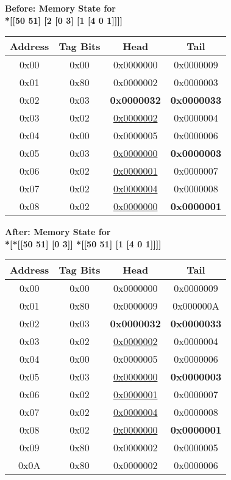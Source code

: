 \begin{figure}[htbp]
\centering

\textbf{Before: Memory State for \\ *[[50 51] [2 [0 3] [1 [4 0 1]]]]}

\vspace{0.3cm}

\begin{tabular}{|c|c|c|c|}
\hline
\textbf{Address} & \textbf{Tag Bits} & \textbf{Head} & \textbf{Tail} \\
\hline\hline
0x00 & 0x00 & 0x0000000 & 0x0000009 \\
0x01 & 0x80 & 0x0000002 & 0x0000003 \\
0x02 & 0x03 & \textbf{0x0000032} & \textbf{0x0000033} \\
0x03 & 0x02 & \underline{0x0000002} & 0x0000004 \\
0x04 & 0x00 & 0x0000005 & 0x0000006 \\
0x05 & 0x03 & \underline{0x0000000} & \textbf{0x0000003} \\
0x06 & 0x02 & \underline{0x0000001} & 0x0000007 \\
0x07 & 0x02 & \underline{0x0000004} & 0x0000008 \\
0x08 & 0x02 & \underline{0x0000000} & \textbf{0x0000001} \\
\hline
\end{tabular}

\vspace{0.5cm}

\textbf{After: Memory State for \\ *[*[[50 51] [0 3]] *[[50 51] [1 [4 0 1]]]]}

\vspace{0.3cm}

\begin{tabular}{|c|c|c|c|}
\hline
\textbf{Address} & \textbf{Tag Bits} & \textbf{Head} & \textbf{Tail} \\
\hline\hline
0x00 & 0x00 & 0x0000000 & 0x0000009 \\
\rowcolor{lightgray}
0x01 & 0x80 & 0x0000009 & 0x000000A \\
0x02 & 0x03 & \textbf{0x0000032} & \textbf{0x0000033} \\
0x03 & 0x02 & \underline{0x0000002} & 0x0000004 \\
0x04 & 0x00 & 0x0000005 & 0x0000006 \\
0x05 & 0x03 & \underline{0x0000000} & \textbf{0x0000003} \\
0x06 & 0x02 & \underline{0x0000001} & 0x0000007 \\
0x07 & 0x02 & \underline{0x0000004} & 0x0000008 \\
0x08 & 0x02 & \underline{0x0000000} & \textbf{0x0000001} \\
\rowcolor{lightgray}
0x09 & 0x80 & 0x0000002 & 0x0000005 \\
\rowcolor{lightgray}
0x0A & 0x80 & 0x0000002 & 0x0000006 \\
\hline
\end{tabular}


\end{figure}
